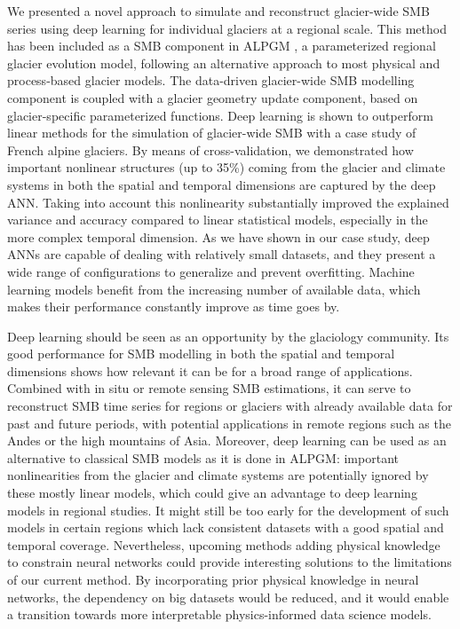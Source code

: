 We presented a novel approach to simulate and reconstruct glacier-wide SMB series using deep learning for individual glaciers at a regional scale. This method has been included as a SMB component in ALPGM \citep{bolibar_jordibolibar/alpgm:_2019}, a parameterized regional glacier evolution model, following an alternative approach to most physical and process-based glacier models. The data-driven glacier-wide SMB modelling component is coupled with a glacier geometry update component, based on glacier-specific parameterized functions. Deep learning is shown to outperform linear methods for the simulation of glacier-wide SMB with a case study of French alpine glaciers. By means of cross-validation, we demonstrated how important nonlinear structures (up to 35\%) coming from the glacier and climate systems in both the spatial and temporal dimensions are captured by the deep ANN. Taking into account this nonlinearity substantially improved the explained variance and accuracy compared to linear statistical models, especially in the more complex temporal dimension. As we have shown in our case study, deep ANNs are capable of dealing with relatively small datasets, and they present a wide range of configurations to generalize and prevent overfitting. Machine learning models benefit from the increasing number of available data, which makes their performance constantly improve as time goes by. 

Deep learning should be seen as an opportunity by the glaciology community. Its good performance for SMB modelling in both the spatial and temporal dimensions shows how relevant it can be for a broad range of applications. Combined with in situ or remote sensing SMB estimations, it can serve to reconstruct SMB time series for regions or glaciers with already available data for past and future periods, with potential applications in remote regions such as the Andes or the high mountains of Asia. Moreover, deep learning can be used as an alternative to classical SMB models as it is done in ALPGM: important nonlinearities from the glacier and climate systems are potentially ignored by these mostly linear models, which could give an advantage to deep learning models in regional studies. It might still be too early for the development of such models in certain regions which lack consistent datasets with a good spatial and temporal coverage. Nevertheless, upcoming methods adding physical knowledge to constrain neural networks \cite[e.g.,][]{karpatne_physics-guided_2018, rackauckas_universal_2020} could provide interesting solutions to the limitations of our current method. By incorporating prior physical knowledge in neural networks, the dependency on big datasets would be reduced, and it would enable a transition towards more interpretable physics-informed data science models. 

